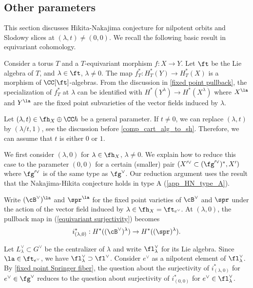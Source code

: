 \documentclass[12pt]{amsart}
\begin{document}
\subsection{Other parameters}\label{canonical parameter section}
This section discusses Hikita-Nakajima conjecture for nilpotent orbits and Slodowy slices at $(\lambda, t)\neq (0,0)$. We recall the following basic result in equivariant cohomology.

Consider a torus $T$ and a $T$-equivariant morphism $f: X\rightarrow Y$. Let $\ft$ be the Lie algebra of $T$, and $\lambda\in \ft$, $\lambda\neq 0$. The map $f^*_{T}: H^{*}_T(Y)\rightarrow H^{*}_T(X)$ is a morphism of $\CC[\ft]$-algebras. From the discussion in \cref{fixed point pullback}, the specialization of $f_{T}^*$ at $\lambda$ can be identified with $H^*(Y^{\lambda}) \rightarrow H^*(X^{\lambda})$ where $X^\la$ and $Y^\la$ are the fixed point subvarieties of the vector fields induced by $\lambda$.

Let $(\lambda, t)\in \fh_X\oplus \CC\hbar$ be a general parameter. If $t\neq 0$, we can replace $(\lambda, t)$ by $(\lambda/t, 1)$, see the discussion before \cref{comp_cart_alg_to_sh}. Therefore, we can assume that $t$ is either $0$ or $1$. 

We first consider $(\lambda, 0)$ for $\lambda\in \fh_X$, $\lambda\neq 0$. We explain how to reduce this case to the parameter $(0,0)$ for a certain (smaller) pair $(X'^\vee\subset (\fg'^\vee)^*, X')$ where $\fg'^\vee$ is of the same type as $\fg^\vee$. Our reduction argument uses the result that the Nakajima-Hikita conjecture holds in type A (\cref{app_HN_type_A}).

Write $(\cB^\vee)^\la$ and $\spr^\la$ for the fixed point varieties of $\cB^\vee$ and $\spr$ under the action of the vector field induced by $\lambda\in \fh_X= \ft_{e^\vee}$. At $(\lambda,0)$, the pullback map in (\ref{equivariant surjectivity}) becomes
$$i^{*}_{(\lambda, 0)}: H^*((\cB^\vee)^{\lambda})\rightarrow H^*((\spr)^{\lambda}).$$

Let $L^{\vee}_\lambda\subset G^\vee$ be the centralizer of $\lambda$ and write $\fl^{\vee}_\lambda$ for its Lie algebra. Since $\la\in \ft_{e^\vee}$, we have $\fl^{\vee}_\lambda \supset \fl^{\vee}$. Consider $e^\vee$ as a nilpotent element of $\fl^{\vee}_\lambda$. By \cref{fixed point Springer fiber}, the question about the surjectivity of $i^*_{(\lambda, 0)}$ for $e^\vee\in \fg^\vee$ reduces to the question about surjectivity of $i^*_{(0,0)}$ for $e^\vee\in \fl^{\vee}_\lambda$. 
\end{document}
